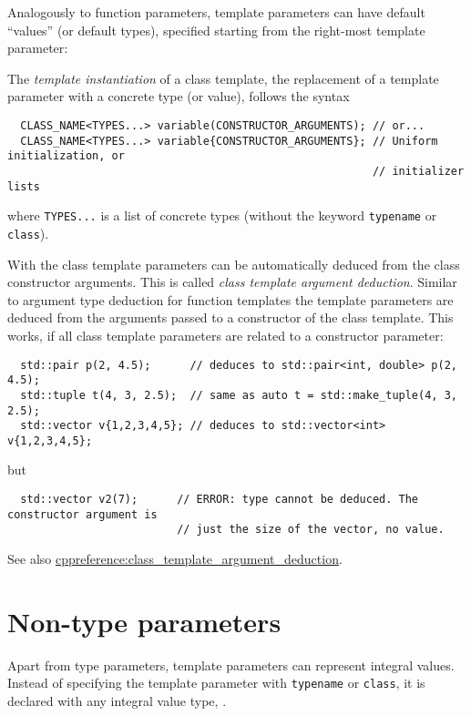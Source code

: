 \begin{rem}
  Analogously to function parameters, template parameters can have default ``values'' (or default types), specified starting from the right-most template
  parameter:
\end{rem}

The \emph{template instantiation} of a class template, \ie the replacement of a template parameter with a concrete type (or value), follows the syntax
\begin{verbatim}
  CLASS_NAME<TYPES...> variable(CONSTRUCTOR_ARGUMENTS); // or...
  CLASS_NAME<TYPES...> variable{CONSTRUCTOR_ARGUMENTS}; // Uniform initialization, or
                                                        // initializer lists
\end{verbatim}
where \texttt{TYPES...} is a list of concrete types (without the keyword \texttt{typename} or \texttt{class}).

\begin{rem}
  With \marginpar{[\cxx{17}]} the class template parameters can be automatically deduced from the class constructor arguments. This
  is called \emph{class template argument deduction}. Similar to argument type deduction for function templates the template parameters
  are deduced from the arguments passed to a constructor of the class template. This works, if all class template parameters are related to
  a constructor parameter:
  \begin{verbatim}
  std::pair p(2, 4.5);      // deduces to std::pair<int, double> p(2, 4.5);
  std::tuple t(4, 3, 2.5);  // same as auto t = std::make_tuple(4, 3, 2.5);
  std::vector v{1,2,3,4,5}; // deduces to std::vector<int> v{1,2,3,4,5};
  \end{verbatim}
  but
  \begin{verbatim}
  std::vector v2(7);      // ERROR: type cannot be deduced. The constructor argument is
                          // just the size of the vector, no value.
  \end{verbatim}

  See also \href{https://en.cppreference.com/w/cpp/language/class_template_argument_deduction}{cppreference:class\_template\_argument\_deduction}.
\end{rem}



\section{Non-type parameters}\label{sec:non_type_parameters}
Apart from type parameters, template parameters can represent integral values. Instead of specifying the template parameter with \texttt{typename} or
\texttt{class}, it is declared with any integral value type, \eg {}.

